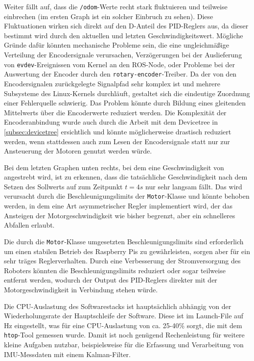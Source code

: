 \documentclass[german]{thesis_KBS}
\newcommand{\code}[1]{\texttt{#1}}  %
\begin{document}
Weiter fällt auf, dass die \code{/odom}-Werte recht stark fluktuieren und
teilweise einbrechen (im ersten Graph ist ein solcher Einbruch zu sehen). Diese
Fluktuationen wirken sich direkt auf den D-Anteil des PID-Reglers aus, da dieser
bestimmt wird durch den aktuellen und letzten Geschwindigkeitswert. Mögliche
Gründe dafür könnten mechanische Probleme sein, die eine ungleichmäßige
Verteilung der Encodersignale verursachen, Verzögerungen bei der Auslieferung
von \code{evdev}-Ereignissen vom Kernel an den ROS-Node, oder Probleme bei der
Auswertung der Encoder durch den \code{rotary-encoder}-Treiber. Da der von den
Encodersignalen zurückgelegte Signalpfad sehr komplex ist und mehrere Subsysteme
des Linux-Kernels durchläuft, gestaltet sich die eindeutige Zuordnung einer
Fehlerquelle schwierig. Das Problem könnte durch Bildung eines gleitenden
Mittelwerts über die Encoderwerte reduziert werden. Die Komplexität der
Encoderanbindung wurde auch durch die Arbeit mit dem Devicetree in
\autoref{subsec:devicetree} ersichtlich und könnte möglicherweise drastisch
reduziert werden, wenn stattdessen \pigpio{} auch zum Lesen der Encodersignale
statt nur zur Ansteuerung der Motoren genutzt werden würde.

Bei dem letzten Graphen unten rechts, bei dem eine Geschwindigkeit von
 angestrebt wird, ist zu erkennen, dass die tatsächliche
Geschwindigkeit nach dem Setzen des Sollwerts auf  zum
Zeitpunkt $t=4s$ nur sehr langsam fällt. Das wird verursacht durch die
Beschleunigungslimits der \code{Motor}-Klasse und könnte behoben werden, in dem
eine Art asymmetrischer Regler implementiert wird, der das Ansteigen der
Motorgeschwindigkeit wie bisher begrenzt, aber ein schnelleres Abfallen
erlaubt.

Die durch die \code{Motor}-Klasse umgesetzten Beschleunigungslimits sind
erforderlich um einen stabilen Betrieb des Raspberry Pis zu gewährleisten,
sorgen aber für ein sehr träges Reglerverhalten. Durch eine Verbesserung der
Stromversorgung des Roboters könnten die Beschleunigungslimits reduziert oder
sogar teilweise entfernt werden, wodurch der Output des PID-Reglers direkter mit
der Motorgeschwindigkeit in Verbindung stehen würde.

Die CPU-Auslastung des Softwarestacks ist hauptsächlich abhängig von der
Wiederholungsrate der Hauptschleife der Software. Diese ist im Launch-File auf
\unit[100]{Hz} eingestellt, was für eine CPU-Auslastung von ca. 25-40\% sorgt,
die mit dem \code{htop}-Tool gemessen wurde. Damit ist noch genügend
Rechenleistung für weitere kleine Aufgaben nutzbar, beispielsweise für die
Erfassung und Verarbeitung von IMU-Messdaten mit einem Kalman-Filter.
\end{document}
